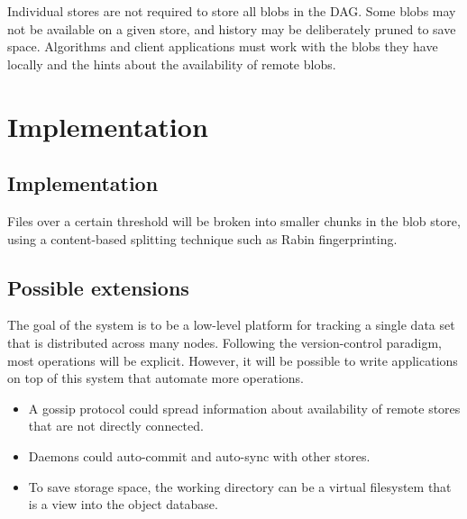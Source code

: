 \documentclass[12pt,a4paper,two-side]{book}
\begin{document}
Individual stores are not required to store all blobs in the DAG. Some blobs may
not be available on a given store, and history may be deliberately pruned to
save space. Algorithms and client applications must work with the blobs they
have locally and the hints about the availability of remote blobs.


\chapter{Implementation}

\section{Implementation}\label{implementation}


Files over a certain threshold will be broken into smaller chunks in the blob
store, using a content-based splitting technique such as Rabin fingerprinting.


\section{Possible extensions}

The goal of the system is to be a low-level platform for tracking a single data
set that is distributed across many nodes. Following the version-control
paradigm, most operations will be explicit. However, it will be possible to
write applications on top of this system that automate more operations.

\begin{itemize}

  \item A gossip protocol could spread information about availability of remote
    stores that are not directly connected.

  \item Daemons could auto-commit and auto-sync with other stores.

  \item To save storage space, the working directory can be a virtual filesystem
    that is a view into the object database.

\end{itemize}

\backmatter


\cleardoublepage
{}
{}

\nocite{*}  %



\end{document}
